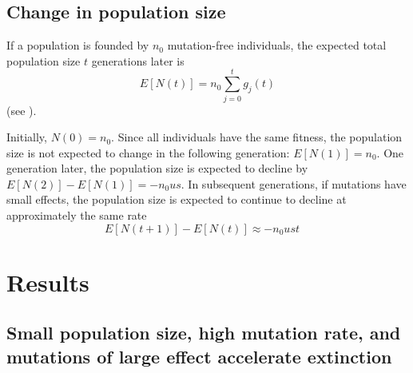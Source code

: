 \documentclass[9pt,lineno]{elife}
\begin{document}
\subsection*{Change in population size}


If a population is founded by $n_0$ mutation-free individuals, the expected total population size $t$ generations later is
%
\begin{equation}
E\left[N(t)\right] = n_0 \sum_{j=0}^t{g_{j}(t)}      
\label{eq:N} %
%
%
\end{equation}
%
(see ).
%

Initially, $N(0) = n_0$.  Since all individuals have the same fitness, the population size is not expected to change in the following generation: $E\left[N(1)\right] = n_0$.  One generation later, the population size is expected to decline by $E\left[N(2)\right] - E\left[N(1)\right] = - n_0us$.  In subsequent generations, if mutations have small effects, the population size is expected to continue to decline at approximately the same rate
%
\begin{equation}
E\left[N(t+1)\right] - E\left[N(t)\right] \approx -n_0 u s t \quad 
\label{eq:deltaN}
\end{equation}




\section{Results}




\subsection{Small population size, high mutation rate, and mutations of large effect accelerate extinction}
\end{document}
